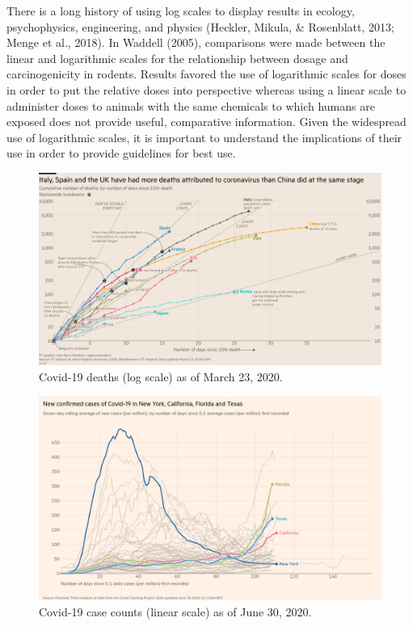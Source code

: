 \documentclass[print]{nuthesis}
\begin{document}
There is a long history of using log scales to display results in ecology, psychophysics, engineering, and physics (Heckler, Mikula, \& Rosenblatt, 2013; Menge et al., 2018).
In Waddell (2005), comparisons were made between the linear and logarithmic scales for the relationship between dosage and carcinogenicity in rodents.
Results favored the use of logarithmic scales for doses in order to put the relative doses into perspective whereas using a linear scale to administer doses to animals with the same chemicals to which humans are exposed does not provide useful, comparative information.
Given the widespread use of logarithmic scales, it is important to understand the implications of their use in order to provide guidelines for best use.

\begin{figure}[tbp]

{\centering \includegraphics[width=0.9\linewidth,]{images/covid19-FT-03.23.2020-log} 

}

\caption[Covid-19 deaths (log scale) as of March 23, 2020]{Covid-19 deaths (log scale) as of March 23, 2020.}\label{fig:covid19-FT-deaths-march2020-log}
\end{figure}

\begin{figure}[tbp]

{\centering \includegraphics[width=0.9\linewidth,]{images/covid19-FT-case-count-06.30.2020-linear} 

}

\caption[Covid-19 case counts (linear scale) as of June 30, 2020]{Covid-19 case counts (linear scale) as of June 30, 2020.}\label{fig:covid19-FT-june2020-case-counts-linear}
\end{figure}
\end{document}
